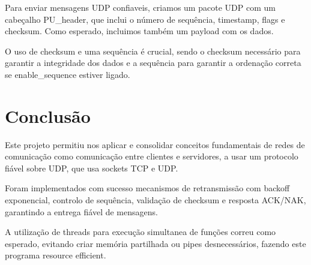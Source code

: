 \documentclass[a4paper, 11pt]{article}
\begin{document}
Para enviar mensagens UDP confiaveis, criamos um pacote UDP com um cabeçalho PU\_header, que inclui o número de sequência, timestamp, flags e checksum. Como esperado, incluimos também um payload com os dados.

O uso de checksum e uma sequência é crucial, sendo o checksum necessário para garantir a integridade dos dados e a sequência para garantir a ordenação correta se enable\_sequence estiver ligado.



\section{Conclusão}
Este projeto permitiu nos aplicar e consolidar conceitos fundamentais de redes de comunicação como comunicação entre clientes e servidores, a usar um protocolo fiável sobre UDP, que usa sockets TCP e UDP.

Foram implementados com sucesso mecanismos de retransmissão com backoff exponencial, controlo de sequência, validação de checksum e resposta ACK/NAK, garantindo a entrega fiável de mensagens.

A utilização de threads para execução simultanea de funções correu como esperado, evitando criar memória partilhada ou pipes desnecessários, fazendo este programa resource efficient.
\end{document}
